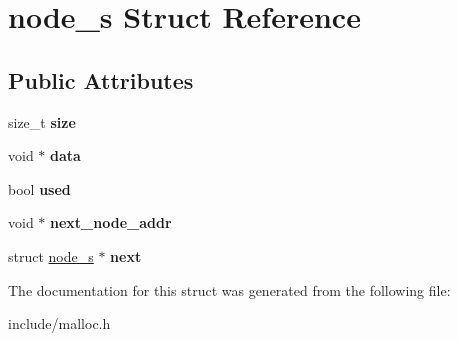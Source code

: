 \hypertarget{structnode__s}{}\section{node\+\_\+s Struct Reference}
\label{structnode__s}
\subsection*{Public Attributes}
\begin{DoxyCompactItemize}
\item 
\mbox{\label{structnode__s_a340cc6491d4e53fdfe33ec73b79409f4}} 
size\+\_\+t {\bfseries size}
\item 
\mbox{\label{structnode__s_ae97adf7c1d652aa8b4fe84cbcdcaea9b}} 
void $\ast$ {\bfseries data}
\item 
\mbox{\label{structnode__s_a6c99201c4dea8cb8f8ce013d3db52d24}} 
bool {\bfseries used}
\item 
\mbox{\label{structnode__s_ab3397c7b2124c17713c40de565a4304f}} 
void $\ast$ {\bfseries next\+\_\+node\+\_\+addr}
\item 
\mbox{\label{structnode__s_a54a59fb31e75eddffc692ba0bc5e5dc9}} 
struct \hyperlink{structnode__s}{node\+\_\+s} $\ast$ {\bfseries next}
\end{DoxyCompactItemize}


The documentation for this struct was generated from the following file\+:\begin{DoxyCompactItemize}
\item 
include/malloc.\+h\end{DoxyCompactItemize}
